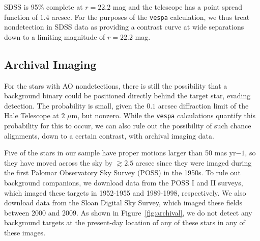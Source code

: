 SDSS is 95\% complete at $r=22.2$ mag and the telescope has a point
spread function of $1.4$ arcsec.
For the purposes of the \texttt{vespa} calculation, we thus
treat nondetection in SDSS data as providing a contrast curve at
wide separations
down to a limiting magnitude of $r=22.2$ mag.

\subsection{Archival Imaging}

For the stars with AO nondetections, there is still the
possibility that a background binary could be positioned
directly behind the target star, evading detection.
The probability is small, given the $0.1$ arcsec diffraction limit
of the Hale Telescope at $2$ $\mu$m, but nonzero.
While the \texttt{vespa} calculations quantify this probability for
this to occur, we can also rule out the possibility of such
chance alignments, down to a certain contrast, with archival imaging data.

Five of the stars in our sample have proper motions larger than 50 mas
yr${-1}$, so they have moved across the sky by $\gtrsim 2.5$ arcsec since
they were imaged during the first Palomar Observatory Sky Survey (POSS) in the
1950s.
To rule out background companions, we download data from the POSS I
and II surveys, which imaged these targets in 1952-1955 and 1989-1998,
respectively.
We also download data from the Sloan Digital Sky Survey, which imaged
these fields between 2000 and 2009.
As shown in Figure~\ref{fig:archival}, we do not detect any background
targets at the present-day location of any of these stars in any of these
images.



